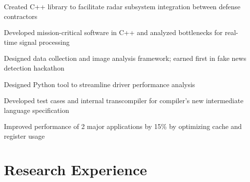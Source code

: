 \documentclass[]{resume-style}
\begin{document}
\vspace{2mm}
\vspace{-1.35mm}
\begin{tightemize}
\vspace{\topsep} %
\item Created C++ library to facilitate radar subsystem integration between defense contractors
\item Developed mission-critical software in C++ and analyzed bottlenecks for real-time signal processing
\item Designed data collection and image analysis framework; earned first in fake news detection hackathon
\end{tightemize}

\vspace{2mm}
\vspace{0.65mm}
\vspace{1.28mm}
\begin{tightemize}
\item Designed Python tool to streamline driver performance analysis
\item Developed test cases and internal transcompiler for compiler's new intermediate language specification
\item Improved performance of 2 major applications by 15\% by optimizing cache and register usage%
\end{tightemize}

\vspace{-0.7mm}
\section{\hfill Research Experience \hfill}
\end{document}
